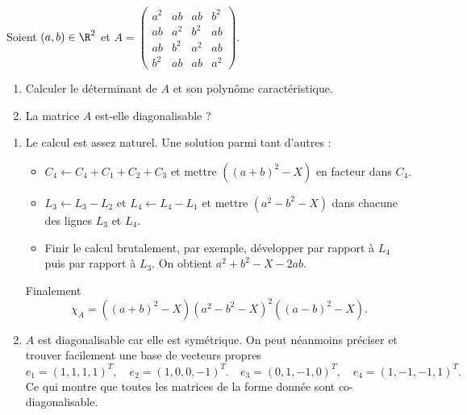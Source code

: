 \begin{enonce}
\begin{exercise}[ID={RMS121/2 E547, Mines-Ponts PSI},subtitle={},tags={}, difficulty={0}]
Soient $(a,b)\in\R^2$ et 
$A=\begin{pmatrix}
a^2& ab  & ab  & b^2\\
ab & a^2 & b^2 & ab\\
ab & b^2 & a^2 & ab\\
b^2& ab  & ab  & a^2
\end{pmatrix}$.
\begin{enumerate}
\item Calculer le déterminant de $A$ et son polynôme caractéristique.
\item La matrice $A$ est-elle diagonalisable ?
\end{enumerate}
\end{exercise}
\begin{solution}
\begin{enumerate}
\item Le calcul est assez naturel. Une solution parmi tant d'autres :
    \begin{itemize}
        \item $C_4\gets C_4+C_1+C_2+C_3$ et mettre $((a+b)^2-X)$ en facteur dans $C_4$.
        \item $L_3\gets L_3-L_2$ et $L_4\gets L_4-L_1$ et mettre $(a^2-b^2-X)$ dans chacune des lignes $L_3$ et $L_4$.
        \item Finir le calcul brutalement, par exemple, développer par rapport à $L_4$ puis par rapport à $L_3$. On obtient $a^2+b^2-X-2ab$.
    \end{itemize}    
Finalement
\begin{equation*}
    \boxed{ \chi_A= \left( (a+b)^2-X \right) \left( a^2-b^2-X \right)^2 \left( (a-b)^2-X \right).}
\end{equation*}
\item $A$ est diagonalisable car elle est symétrique.
On peut néanmoins préciser et trouver facilement une base de vecteurs propres
\begin{equation*}
e_1=(1,1,1,1)^T,\quad
e_2=(1,0,0,-1)^T.\quad
e_3=(0,1,-1,0)^T,\quad
e_4=(1,-1,-1,1)^T.
\end{equation*}
Ce qui montre que toutes les matrices de la forme donnée sont co-diagonalisable.
\end{enumerate}
\end{solution}
\end{enonce}
